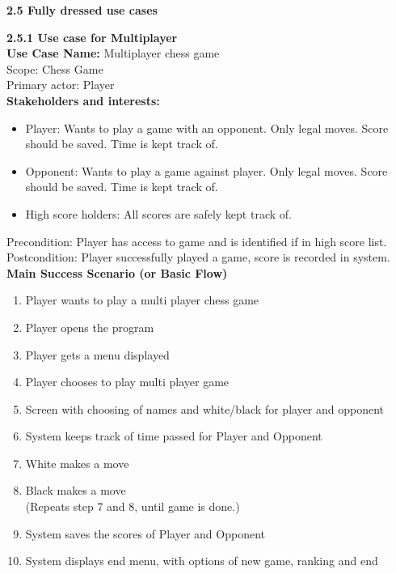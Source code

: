 \documentclass{article}
\begin{document}
\clearpage
\begin{flushleft}
\vspace{5mm}	
\textbf{2.5	Fully dressed use cases}\\
\vspace{3mm}
	
\textbf{2.5.1	Use case for Multiplayer}\\
\vspace{3mm}
	\textbf {Use Case Name:} Multiplayer chess game\\
	\vspace{1mm}
	Scope: Chess Game\\
	\vspace{1mm}
	Primary actor: Player\\
	\vspace{1mm}
	\textbf{Stakeholders and interests:}\\
	\begin{itemize}
	
		\item Player: Wants to play a game with an opponent. Only legal moves. Score should be saved. Time is kept track of.\\
	
		\item Opponent: Wants to play a game against player. Only legal moves. Score should be saved. Time is kept track of.\\
	
		\item High score holders: All scores are safely kept track of.
		
	\end{itemize}
	
	Precondition: Player has access to game and is identified if in high score list.\\
	\vspace{1mm}
	Postcondition: Player successfully played a game, score is recorded in system.\\
	\vspace{2mm}
	\textbf{Main Success Scenario (or Basic Flow)}\\
	
	\begin{enumerate}
	
	\item	 Player wants to play a multi player chess game
	\item 	 Player opens the program
	\item 	 Player gets a menu displayed
	\item 	 Player chooses to play multi player game
	\item 	 Screen with choosing of names and white/black for player and opponent
	\item 	 System keeps track of time passed for Player and Opponent
	\item 	White makes a move
	\item	Black makes a move\\
	(Repeats step 7 and 8, until game is done.)
	\item 	System saves the scores of Player and Opponent
	\item 	System displays end menu, with options of new game, ranking and end
	

\end{enumerate}
\end{flushleft}
\end{document}
